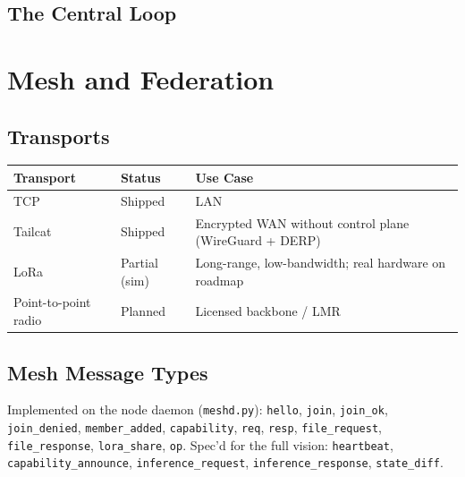 \documentclass[11pt,a4paper]{article}
\newcommand{\shipped}{Shipped}
\newcommand{\planned}{Planned}
\begin{document}
\subsection{The Central Loop}
\begin{center}
\end{center}

\section{Mesh and Federation}
\subsection{Transports}
\begin{center}
\begin{tabularx}{\textwidth}{l l X}
\toprule
\textbf{Transport} & \textbf{Status} & \textbf{Use Case} \\
\midrule
TCP & \shipped & LAN \\
Tailcat & \shipped & Encrypted WAN without control plane (WireGuard + DERP) \\
LoRa & Partial (sim) & Long-range, low-bandwidth; real hardware on roadmap \\
Point-to-point radio & \planned & Licensed backbone / LMR \\
\bottomrule
\end{tabularx}
\end{center}

\subsection{Mesh Message Types}
Implemented on the node daemon (\texttt{meshd.py}): \texttt{hello}, \texttt{join}, \texttt{join\_ok}, \texttt{join\_denied}, \texttt{member\_added}, \texttt{capability}, \texttt{req}, \texttt{resp}, \texttt{file\_request}, \texttt{file\_response}, \texttt{lora\_share}, \texttt{op}. Spec'd for the full vision: \texttt{heartbeat}, \texttt{capability\_announce}, \texttt{inference\_request}, \texttt{inference\_response}, \texttt{state\_diff}.
\end{document}
